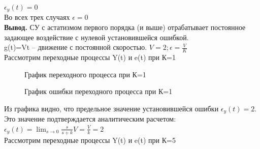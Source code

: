 \documentclass[a4paper, 11pt]{article}
\begin{document}
$\epsilon_y(t)=0$\\

Во всех трех случаях $\epsilon = 0$\\

\textbf{Вывод.} СУ с астатизмом первого порядка (и выше) отрабатывает постоянное задающее воздействие с нулевой установившейся ошибкой.\\


g(t)=Vt – движение с постоянной скоростью.  $V = 2; \epsilon=\frac{V}{K}$\\

Рассмотрим переходные процессы Y(t) и e(t) при К=1

\begin{figure}[h!]
    \caption{График переходного процесса при К=1}
    \label{two}
\end{figure}

\begin{figure}[h!]
    \caption{График ошибки переходного процесса при К=1}
    \label{tree}
\end{figure}

\newpage

Из графика видно, что предельное значение установившейся ошибки $\epsilon_y(t)=2$. Это значение подтверждается аналитическим расчетом: $\epsilon_y(t)=\lim_{s\to0}\frac{s}{s+k}V=\frac{V}{k}=2$\\

Рассмотрим переходные процессы Y(t) и e(t) при К=5
\end{document}
